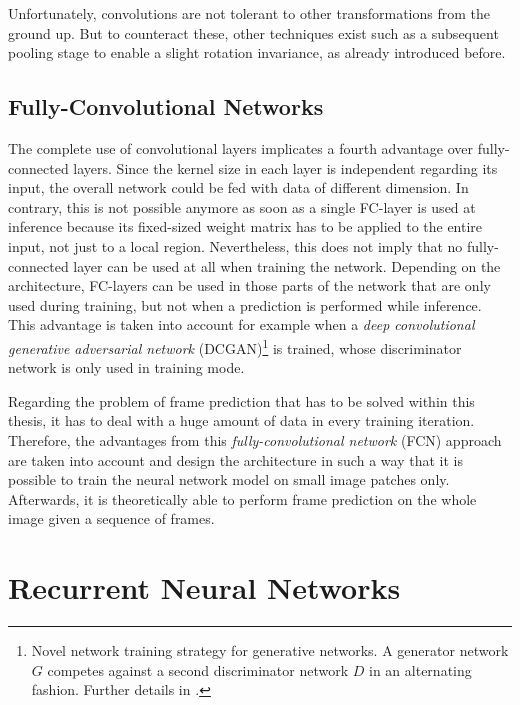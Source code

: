 Unfortunately, convolutions are not tolerant to other transformations from the ground up. But to counteract these, other techniques exist such as a subsequent pooling stage to enable a slight rotation invariance, as already introduced before.


\subsection{Fully-Convolutional Networks}

The complete use of convolutional layers implicates a fourth advantage over fully-connected layers. Since the kernel size in each layer is independent regarding its input, the overall network could be fed with data of different dimension. In contrary, this is not possible anymore as soon as a single FC-layer is used at inference because its fixed-sized weight matrix has to be applied to the entire input, not just to a local region. Nevertheless, this does not imply that no fully-connected layer can be used at all when training the network. Depending on the architecture, FC-layers can be used in those parts of the network that are only used during training, but not when a prediction is performed while inference. This advantage is taken into account for example when a \textit{deep convolutional generative adversarial network} (DCGAN)\footnote{Novel network training strategy for generative networks. A generator network $ G $ competes against a second discriminator network $ D $ in an alternating fashion. Further details in \parencite{gan}.} is trained, whose discriminator network is only used in training mode.

Regarding the problem of frame prediction that has to be solved within this thesis, it has to deal with a huge amount of data in every training iteration. Therefore, the advantages from this \textit{fully-convolutional network} (FCN) approach are taken into account and design the architecture in such a way that it is possible to train the neural network model on small image patches only. Afterwards, it is theoretically able to perform frame prediction on the whole image given a sequence of frames.


\section{Recurrent Neural Networks}

